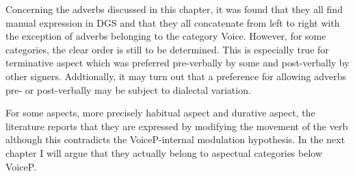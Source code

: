 Concerning the adverbs discussed in this chapter, it was found that they all find manual expression in DGS and that they all concatenate from left to right with the exception of adverbs belonging to the category Voice. However, for some categories, the clear order is still to be determined. This is especially true for terminative aspect which was preferred pre-verbally by some and post-verbally by other signers. Addtionally, it may turn out that a preference for allowing adverbs pre- or post-verbally may be subject to dialectal variation.  

For some aspects, more precisely habitual aspect and durative aspect, the literature reports that they are expressed by modifying the movement of the verb although this contradicts the VoiceP-internal modulation hypothesis. In the next chapter I will argue that they actually belong to aspectual categories below VoiceP.

